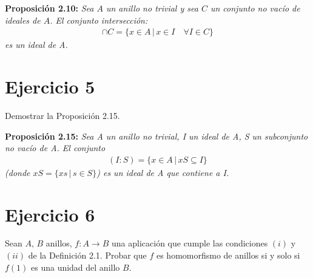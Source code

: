 \documentclass[10pt,a4paper]{article}
\begin{document}
	\textbf{Proposición 2.10:} \textit{Sea $A$ un anillo no trivial y sea $C$ un conjunto no vacío de ideales de $A$. El conjunto intersección:}
	\begin{gather*}
		\cap C =\{ x\in A \, \vert \, x\in I \quad \forall I \in C \} 
	\end{gather*}
	 \textit{es un ideal de A.}
	
	
	
	
	
	\section{Ejercicio 5}
	
	Demostrar la Proposición 2.15.
	
	
	\textbf{Proposición 2.15:} \textit{Sea A un anillo no trivial, I un ideal de A, S un subconjunto no vacío de A. El conjunto}
	\begin{gather*}
	\left( I \colon S \right) = \{ x\in A \, \vert \, xS \subseteq I \} 
	\end{gather*}
	\textit{ (donde $ xS = \{ xs \, \vert \, s \in S \} $)	es un ideal de A que contiene a I.}
	
	
	
	
	
	
	
	
	\section{Ejercicio 6}
	
	Sean $A,\, B$ anillos, $f:A\rightarrow B$ una aplicación que cumple las condiciones $(i)$ y $(ii)$ de la Definición 2.1. Probar que $f$ es homomorfismo de anillos si y solo si $f(1)$ es una unidad del anillo $B$.
	
	
	
	
	
	
	
\end{document}
